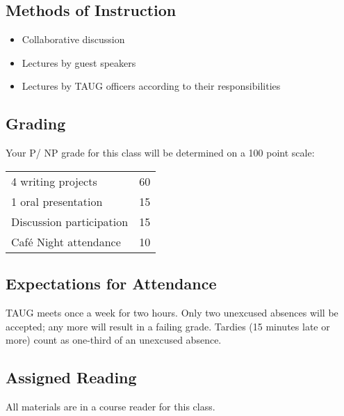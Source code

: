 \subsection{Methods of Instruction}
\begin{itemize}
	\item Collaborative discussion
	\item Lectures by guest speakers
	\item Lectures by TAUG officers according to their responsibilities
\end{itemize}

\subsection{Grading}
Your P/ NP grade for this class will be determined on a 100 point scale:

\begin{center}
	\begin{tabular}{lr}
		4 writing projects & 60 \\
		1 oral presentation & 15 \\
		Discussion participation & 15 \\
		Caf\'e Night attendance & 10
	\end{tabular}
\end{center}

\subsection{Expectations for Attendance}
TAUG meets once a week for two hours. Only two unexcused absences will be accepted; any more will result in a failing grade. Tardies (15 minutes late or more) count as one-third of an unexcused absence.

\subsection{Assigned Reading}
All materials are in a course reader for this class.